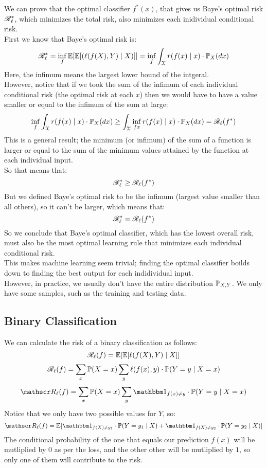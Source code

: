 \documentclass[12pt]{article}
\begin{document}
We can prove that the optimal classifier
$f^*(x)$,
that gives us Baye's optimal risk $\mathscr{R}_\ell^*$,
which minimizes the total risk,
also minimizes each inidividual conditional risk. \\
First we know that Baye's optimal risk is:
\[ \mathscr{R}_\ell^* = \inf_f 
\mathbb{E}[\mathbb{E}[(\ell(f(X), Y) \mid X)]]
= \inf_f \int_{\mathcal{X}} r(f(x) \mid x) \cdot
\mathbb{P}_X(dx) \]
Here, the infimum means the largest lower bound
of the intgeral. \\
However, notice that if we took the sum of the
infimum of each individual conditional risk
(the optimal risk at each $x$)
then we would have to have a value smaller
or equal to the infimum of the sum at large:
\[ \inf_f \int_{\mathcal{X}} r(f(x) \mid x) \cdot
\mathbb{P}_X(dx)
\geq \int_{\mathcal{X}} \inf_{fx} r(f(x) \mid x) \cdot
\mathbb{P}_X(dx) = \mathscr{R}_\ell(f^*) \]
This is a general result;
the minimum (or infimum) of the sum
of a function is larger or equal to the
sum of the minimum values attained
by the function at each individual input. \\
So that means that:
\[ \mathscr{R}_\ell^* \geq \mathscr{R}_\ell(f^*) \]
But we defined Baye's optimal risk
to be the infimum (largest value
smaller than all others),
so it can't be larger, which means that:
\[ \mathscr{R}_\ell^* = \mathscr{R}_\ell(f^*) \]
So we conclude that Baye's optimal classifier,
which has the lowest overall risk,
must also be the most optimal learning rule
that minimizes each individual conditional
risk. \\

This makes machine learning seem trivial;
finding the optimal classifier boilds
down to finding the best output for each
indidividual input. \\
However, in practice, we usually don't have
the entire distribution $\mathbb{P}_{X, Y}$.
We only have some samples, such as the training
and testing data. \\

\newpage

\subsection*{Binary Classification}

We can calculate the risk of a binary
classification as follows:
\[ \mathscr{R}_\ell(f)
= \mathbb{E}[\mathbb{E}[\ell(f(X), Y) \mid X]] \]
\[ \mathscr{R}_\ell(f)
=  \sum_x \mathbb{P}(X = x)
\sum_y \ell(f(x), y) \cdot
\mathbb{P}(Y = y \mid X = x) \]
\[ \rscr_\ell(f)
= \sum_x \Pb(X = x)
\sum_y \indicator_{f(x) \neq y}\cdot
\Pb(Y = y \mid X = x) \]
Notice that we only have two possible
values for $Y$, so:
\[ \rscr_\ell(f)
= \E[ \indicator_{f(X) \neq y_1}\cdot
\Pb(Y = y_1 \mid X) +
\indicator_{f(X) \neq y_2}\cdot
\Pb(Y = y_2 \mid X)] \]
The conditional probability of the one
that equals our prediction $f(x)$
will be mutliplied by $0$ as per the loss,
and the other other will be mutliplied
by $1$,
so only one of them will contribute
to the risk. \\
\end{document}
